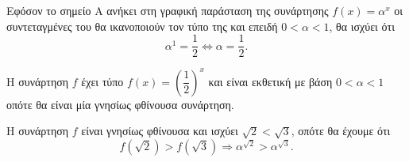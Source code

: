 \begin{alist}
\item Εφόσον το σημείο $\text{A}$ ανήκει στη γραφική παράσταση της συνάρτησης $f(x) = \alpha^x$ οι συντεταγμένες του θα ικανοποιούν τον τύπο της και επειδή $0 < \alpha < 1$, θα ισχύει ότι
\[\alpha^1 = \frac{1}{2} \Leftrightarrow \alpha = \frac{1}{2}.\]
\item 
\begin{rlist}
\item Η συνάρτηση $f$ έχει τύπο $f(x) = \left(\dfrac{1}{2}\right)^x$ και είναι εκθετική με βάση $0 < \alpha < 1$ οπότε θα είναι μία γνησίως φθίνουσα συνάρτηση.
\item Η συνάρτηση $f$ είναι γνησίως φθίνουσα και ισχύει $\sqrt{2} < \sqrt{3}$, οπότε θα έχουμε ότι
\[f(\sqrt{2}) > f(\sqrt{3}) \Rightarrow \alpha^{\sqrt{2}} > \alpha^{\sqrt{3}}.\]
\end{rlist}
\end{alist}

